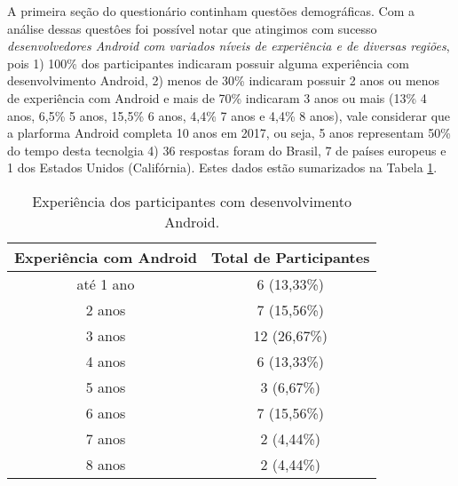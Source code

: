 A primeira se\c{c}\~ao do question\'ario continham quest\~oes demogr\'aficas. Com a an\'alise dessas quest\^oes foi poss\'ivel notar que atingimos com sucesso \textit{desenvolvedores Android com variados n\'iveis de experi\^encia e de diversas regi\~oes}, pois 1) 100\% dos participantes indicaram possuir alguma experi\^encia com desenvolvimento Android, 2) menos de 30\% indicaram possuir 2 anos ou menos de experi\^encia com Android e mais de 70\% indicaram 3 anos ou mais (13\% 4 anos, 6,5\% 5 anos, 15,5\% 6 anos, 4,4\% 7 anos e 4,4\% 8 anos), vale considerar que a plarforma Android completa 10 anos em 2017, ou seja, 5 anos representam 50\% do tempo desta tecnolgia 4) 36 respostas foram do Brasil, 7 de pa\'ises europeus e 1 dos Estados Unidos (Calif\'ornia). Estes dados est\~ao sumarizados na Tabela \ref{tab:DadosDemograficos}.

\begin{table}[h]
\centering
\caption{Experi\^encia dos participantes com desenvolvimento Android.}
\begin{tabular}{c|c}
Experi\^encia com Android & Total de Participantes \\
\hline
at\'e 1 ano 	&	6 (13,33\%) \\
2 anos 			& 	 7 (15,56\%) \\
3 anos 			& 	 12 (26,67\%) \\
4 anos 			& 	 6 (13,33\%) \\
5 anos 			& 	 3 (6,67\%) \\
6 anos 			& 	 7 (15,56\%) \\
7 anos 			& 	 2 (4,44\%) \\
8 anos 			& 	 2 (4,44\%) \\

\end{tabular}
\label{tab:DadosDemograficos}
\end{table}


